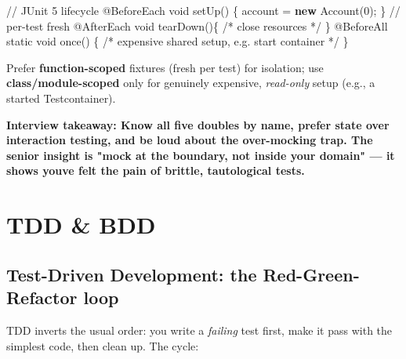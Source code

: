 \documentclass[11pt]{article}
\newenvironment{Shaded}{\begin{snugshade}}{\end{snugshade}}
\newcommand{\AttributeTok}[1]{\textcolor[rgb]{0.16,0.50,0.73}{#1}}
\newcommand{\CommentTok}[1]{\textcolor[rgb]{0.48,0.49,0.49}{#1}}
\newcommand{\DataTypeTok}[1]{\textcolor[rgb]{0.16,0.50,0.73}{#1}}
\newcommand{\DecValTok}[1]{\textcolor[rgb]{0.96,0.45,0.00}{#1}}
\newcommand{\FunctionTok}[1]{\textcolor[rgb]{0.56,0.27,0.68}{#1}}
\newcommand{\KeywordTok}[1]{\textcolor[rgb]{0.81,0.81,0.76}{\textbf{#1}}}
\newcommand{\NormalTok}[1]{\textcolor[rgb]{0.81,0.81,0.76}{#1}}
\newcommand{\OperatorTok}[1]{\textcolor[rgb]{0.81,0.81,0.76}{#1}}
\begin{document}

\begin{Shaded}
\begin{Highlighting}[]
\CommentTok{// JUnit 5 lifecycle}
\AttributeTok{@BeforeEach} \DataTypeTok{void} \FunctionTok{setUp}\OperatorTok{()}  \OperatorTok{\{}\NormalTok{ account }\OperatorTok{=} \KeywordTok{new} \FunctionTok{Account}\OperatorTok{(}\DecValTok{0}\OperatorTok{);} \OperatorTok{\}}  \CommentTok{// per{-}test fresh}
\AttributeTok{@AfterEach}  \DataTypeTok{void} \FunctionTok{tearDown}\OperatorTok{()\{} \CommentTok{/* close resources */} \OperatorTok{\}}
\AttributeTok{@BeforeAll} \DataTypeTok{static} \DataTypeTok{void} \FunctionTok{once}\OperatorTok{()} \OperatorTok{\{} \CommentTok{/* expensive shared setup, e.g. start container */} \OperatorTok{\}}
\end{Highlighting}
\end{Shaded}

Prefer \textbf{function-scoped} fixtures (fresh per test) for isolation; use \textbf{class/module-scoped} only for genuinely expensive, \emph{read-only} setup (e.g., a started Testcontainer).

\textbf{Interview takeaway: Know all five doubles by name, prefer state over interaction testing, and be loud about the over-mocking trap. The senior insight is "mock at the boundary, not inside your domain" --- it shows you\textquotesingle ve felt the pain of brittle, tautological tests.}

\section{TDD \& BDD}\label{tdd--bdd}

\subsection{Test-Driven Development: the Red-Green-Refactor loop}\label{test-driven-development-the-red-green-refactor-loop}

TDD inverts the usual order: you write a \emph{failing} test first, make it pass with the simplest code, then clean up. The cycle:

\end{document}
